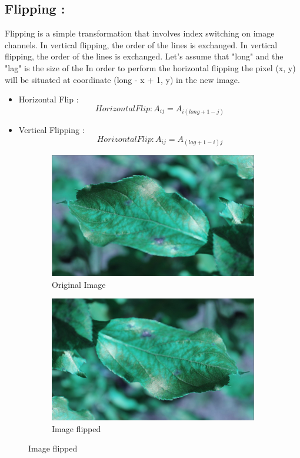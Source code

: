 \documentclass[a4paper]{article}
\begin{document}
\subsection{Flipping : }

Flipping is a simple transformation that involves index switching on image channels. In vertical flipping, the order of the lines is exchanged. In vertical flipping, the order of the lines is exchanged. Let's assume that "long" and the "lag" is the size of the  
In order to perform the horizontal flipping the pixel (x, y) will be situated at coordinate (long - x + 1, y) in the new image.\\
\begin{itemize}
    \item {
    Horizontal Flip :  
    \begin{equation} 
	Horizontal Flip:  A_{ij} = A_{i(long +1 -j)}
	\end{equation}
	}
    \item{
    Vertical Flipping :
	\begin{equation} 
	Horizontal Flip:  A_{ij} = A_{(lag +1 -i)j}
	\end{equation}
    }

\end{itemize}

\begin{figure}[H]
\centering
\begin{subfigure}{\textwidth}
  \centering
  \includegraphics[width=.4\linewidth]{images/origina.png}
  \caption{Original Image}
  \label{fig:sub1}
\end{subfigure}%
\begin{subfigure}{\textwidth}
  \centering
  \includegraphics[width=.4\linewidth]{images/flipped.png}
  \caption{Image flipped}
  \label{fig:sub2}
\end{subfigure}
\label{fig:test}
\end{figure}
\end{document}
